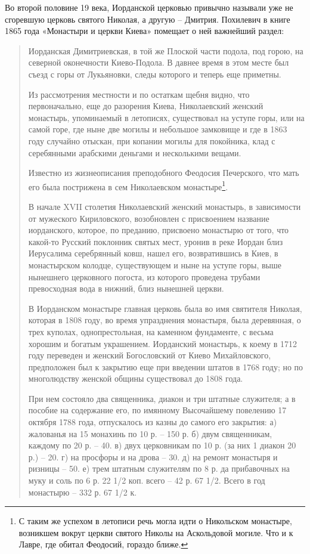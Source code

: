 Во второй половине 19 века, Иорданской церковью привычно называли уже не сгоревшую церковь святого Николая, а другую – Дмитрия. Похилевич в книге 1865 года «Монастыри и церкви Киева» помещает о ней важнейший раздел:

\begin{quotation}
Иорданская Димитриевская, в той же Плоской части подола, под горою, на северной оконечности Киево-Подола. В давнее время в этом месте был съезд с горы от Лукьяновки, следы которого и теперь еще приметны. 

Из рассмотрения местности и по остаткам щебня видно, что первоначально, еще до разорения Киева, Николаевский женский монастырь, упоминаемый в летописях, существовал на уступе горы, или на самой горе, где ныне две могилы и небольшое замковище и где в 1863 году случайно отыскан, при копании могилы для покойника, клад с серебянными арабскими деньгами и несколькими вещами.

Известно из жизнеописания преподобного Феодосия Печерского, что мать его была пострижена в сем Николаевском монастыре\footnote{С таким же успехом в летописи речь могла идти о Никольском монастыре, возникшем вокруг церкви святого Николы на Аскольдовой могиле. Что и к Лавре, где обитал Феодосий, гораздо ближе.}.

В начале XVII столетия Николаевский женский монастырь, в зависимости от мужеского Кириловского, возобновлен с присвоением название иорданского, которое, по преданию, присвоено монастырю от того, что какой-то Русский поклонник святых мест, уронив в реке Иордан близ Иерусалима серебрянный ковш, нашел его, возвратившись в Киев, в монастырском колодце, существующем и ныне на уступе горы, выше нынешнего церковного погоста, из которого проведена трубами превосходная вода в нижний, близ нынешней церкви.

В Иорданском монастыре главная церковь была во имя святителя Николая, которая в 1808 году, во время упразднения монастыря, была деревянная, о трех куполах, однопрестольная, на каменном фундаменте, с весьма хорошим и богатым украшением. Иорданский монастырь, к коему в 1712 году переведен и женский Богословский от Киево Михайловского, предположен был к закрытию еще при введении штатов в 1768 году; но по многолюдству женской общины существовал до 1808 года. 

При нем состояло два священника, диакон и три штатные служителя; а в пособие на содержание его, по имянному Высочайшему повелению 17 октября 1788 года, отпускалось из казны до самого его закрытия:
а) жалованья на 15 монахинь по 10 р. – 150 р.
б) двум священникам, каждому по 20 р. – 40.
в) двух церковникам по 10 р. (за них 1 диакон 20 р.)  – 20.
г) на просфоры и на дрова – 30.
д) на ремонт монастыря и ризницы – 50.
е) трем штатным служителям по 8 р. да прибавочных на муку и соль по 6 р. 22 1/2 коп. всего  – 42 р. 67 1/2. Всего в год монастырю – 332 р. 67 1/2 к.


\end{quotation}
